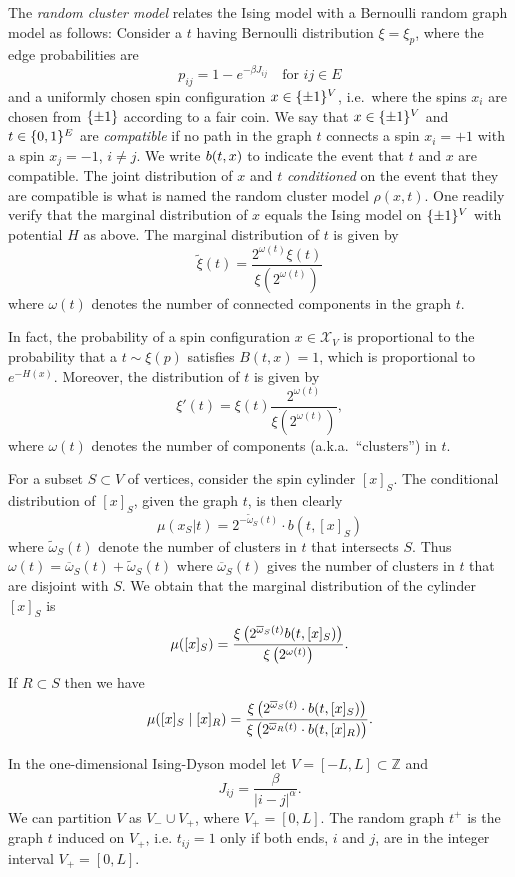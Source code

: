 \documentclass[11pt, a4paper, oneside]{article}
\theoremstyle{definition}
\theoremstyle{remark}
\providecommand{\ZZ}{\mathbb{Z}}
\providecommand{\mscr}{\mathscr}
\providecommand{\ol}{\overline}
\providecommand{\tl}{\tilde}
\def\X{\mscr X}
\begin{document}
The \emph{random cluster model} relates the Ising model with a Bernoulli random
graph model as follows: Consider a $t$ having Bernoulli distribution
$\xi=\xi_p$, where the edge probabilities are
\[ p_{ij} = 1 - e^{-\beta J_{ij}} \quad \text{for $ij\in E$}\] and a uniformly
chosen spin configuration $x\in\{\pm1\}^V$, i.e.\ where the spins $x_i$ are chosen
from $\{\pm1\}$ according to a fair coin. We say that $x\in \{\pm1\}^V$ and $t\in\{0,1\}^E$
are \emph{compatible} if no path in the graph $t$ connects a spin $x_i=+1$ with
a spin $x_j=-1$, $i\not=j$. We write $b(t,x)$ to indicate the event that $t$
and $x$ are compatible. The joint distribution of $x$ and $t$ \emph{conditioned}
on the event that they are compatible is what is named the random cluster model
$\rho(x,t)$. One readily verify that the marginal distribution of $x$ equals the
Ising model on $\{\pm1\}^V$ with potential $H$ as above. The marginal distribution of
$t$ is given by
\[
  \tl\xi(t) = \frac{2^{\omega(t)}\xi(t)}{\xi(2^{\omega(t)})}
\]
where $\omega(t)$ denotes the number of connected components in the graph $t$.

In fact, the probability of a spin configuration $x\in\X_V$ is
proportional to the probability that a $t\sim\xi(p)$ satisfies $B(t,x)=1$, which
is proportional to $e^{-H(x)}$. Moreover, the distribution of $t$ is given by
\[
  \xi'( t ) = \xi(t) \frac{2^{\omega(t)}}{\xi(2^{\omega(t)})},
\]
where $\omega(t)$ denotes the number of components (a.k.a.~``clusters'') in $t$.

\def\cy#1{[x]_{#1}}

For a subset $S\subset V$ of vertices, consider the spin cylinder $\cy S$.
The conditional distribution of $\cy S$, given the graph $t$, is then clearly
\[ \mu(x_S|t) = 2^{-\tl\omega_S(t)} \cdot b(t, \cy S)\] 
where $\tl\omega_S(t)$ denote the number of clusters in $t$ that intersects $S$.
Thus
\(\omega(t)=\ol\omega_S(t)+\tl\omega_S(t)\) where $\ol\omega_S(t)$ gives the
number of clusters in $t$ that are disjoint with $S$. We obtain that the
marginal distribution of the cylinder $\cy S$ is 
\[\mu(\cy S) = \frac{\XI{ 2^{\ol\omega_S(t)} b(t,\cy S)}}{\XI{2^{\omega(t)}}}. \]
If $R\subset S$ then we have
\[\mu(\cy S\mid \cy R) =
  \frac{\XI{2^{\ol\omega_S(t)} \cdot b(t,\cy S)}}
  {\XI{2^{\ol\omega_R(t)} \cdot b(t,\cy R)}}. \]

In the one-dimensional Ising-Dyson model let $V=[-L,L]\subset \ZZ$ and
\[ J_{ij} = \frac \beta{|i-j|^\alpha}.\]
We can
partition $V$ as $V_- \cup V_+$, where $V_+=[0,L]$. The random graph $t^+$ is the
graph $t$ induced on $V_+$, i.e. $t_{ij}=1$ only if both ends, $i$ and $j$, are
in the integer interval $V_+=[0,L]$.
\end{document}
